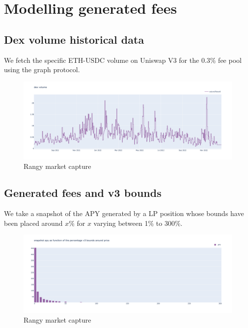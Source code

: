 \documentclass[conference]{IEEEtran}
\begin{document}
\section{Modelling generated fees}
\subsection{Dex volume historical data}
We fetch the specific ETH-USDC volume on Uniswap V3 for the 0.3\% fee pool using the graph protocol.
\begin{figure}[h!]
    \centering
    \includegraphics[scale=0.15]{Plots/dex_volume_ETH.png}
    \caption{Rangy market capture}
    \label{fig:dex_volume}
\end{figure}
\subsection{Generated fees and v3 bounds}
We take a snapshot of the APY generated by a LP position whose bounds have been placed around $x\%$ for $x$ varying between 1\% to 300\%.
\begin{figure}[h!]
    \centering
    \includegraphics[scale=0.15]{Plots/apy_snapshot_ETH.png}
    \caption{Rangy market capture}
    \label{fig:apy_snapshot}
\end{figure}
\end{document}

